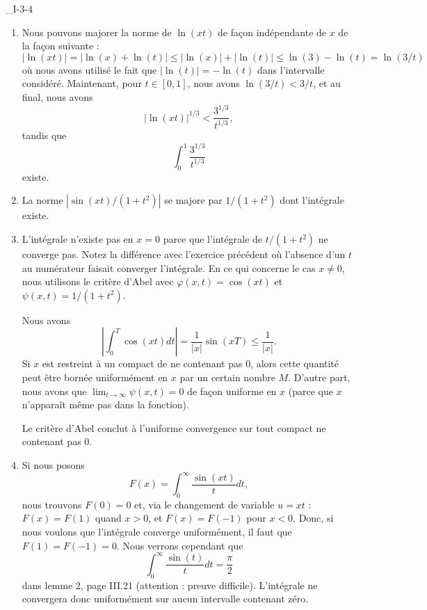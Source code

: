 \begin{corrige}{_I-3-4}
\begin{enumerate}
\item 
	Nous pouvons majorer la norme de $\ln(xt)$ de façon indépendante de $x$ de la façon suivante :
	\begin{equation}
		| \ln(xt) |=| \ln(x)+\ln(t) |\leq| \ln(x) |+| \ln(t) |\leq\ln(3)-\ln(t)=\ln(3/t)
	\end{equation}
	où nous avons utilisé le fait que $|\ln(t)|=-\ln(t)$ dans l'intervalle considéré. Maintenant, pour $t\in[0,1]$, nous avons $\ln(3/t)<3/t$, et au final, nous avons
	\begin{equation}
		| \ln(xt) |^{1/3}<\frac{ 3^{1/3} }{ t^{1/3} },
	\end{equation}
	tandis que
	\begin{equation}
		\int_0^1\frac{ 3^{1/3} }{ t^{1/3} }
	\end{equation}
	existe.

\item
	La norme $| \sin(xt)/(1+t^2) |$ se majore par $1/(1+t^2)$ dont l'intégrale existe.
\item
	L'intégrale n'existe pas en $x=0$ parce que l'intégrale de $t/(1+t^2)$ ne converge pas. Notez la différence avec l'exercice précédent où l'absence d'un $t$ au numérateur faisait converger l'intégrale. En ce qui concerne le cas $x\neq 0$, nous utilisons le critère d'Abel avec $\varphi(x,t)=\cos(xt)$ et $\psi(x,t)=1/(1+t^2)$.

Nous avons
\begin{equation}
	|\int_0^T\cos(xt)dt |=\frac{1}{ | x | }\sin(xT)\leq \frac{1}{ | x | }.
\end{equation}
Si $x$ est restreint à un compact de ne contenant pas $0$, alors cette quantité peut être bornée uniformément en $x$ par un certain nombre $M$. D'autre part, nous avons que $\lim_{t\to\infty}\psi(x,t)=0$ de façon uniforme en $x$ (parce que $x$ n'apparaît même pas dans la fonction).

Le critère d'Abel conclut à l'uniforme convergence sur tout compact ne contenant pas $0$.

\item 
Si nous posons 
\begin{equation}
	F(x)=\int_0^{\infty}\frac{ \sin(xt) }{ t }dt,
\end{equation}
nous trouvons $F(0)=0$ et, via le changement de variable $u=xt$ : $F(x)=F(1)$ quand $x>0$, et $F(x)=F(-1)$ pour $x<0$. Donc, si nous voulons que l'intégrale converge uniformément, il faut que $F(1)=F(-1)=0$. Nous verrons cependant que
\begin{equation}		\label{EqIntSinSurt}
	\int_0^{\infty}\frac{ \sin(t) }{ t }dt=\frac{ \pi }{ 2 }
\end{equation}
dans lemme 2, page III.21 (attention : preuve difficile). L'intégrale ne convergera donc uniformément sur aucun intervalle contenant zéro.


\end{enumerate}
\end{corrige}
